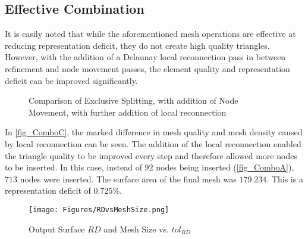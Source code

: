 \subsection{Effective Combination}
It is easily noted that while the aforementioned mesh operations are
effective at reducing representation deficit, they do not create high
quality triangles.  However, with the addition of a Delaunay local
reconnection pass in between refinement and node movement passes, the
element quality and representation deficit can be improved
significantly.

\begin{figure}[h!]
  \begin{center}
  \caption{Comparison of Exclusive Splitting, with addition of Node
Movement, with further addition of local reconnection}
  \label{fig_NodeSmoothing}
  \end{center}
\end{figure}

In \ref{fig_ComboC}, the marked difference in mesh quality and mesh
density caused by local reconnection can be seen.  The addition of the
local reconnection enabled the triangle quality to be improved every
step and therefore allowed more nodes to be inserted. In this case, 
instead of $92$ nodes being inserted (\ref{fig_ComboA}), $713$ nodes were
inserted. The surface area of the final mesh was $179.234$. This is a
representation deficit of $0.725\%$.

\begin{figure}[h!]
  \begin{center}
  \texttt{[image: Figures/RDvsMeshSize.png]}
  \caption{Output Surface $RD$ and Mesh Size vs. $tol_{RD}$}
  \label{fig_RDvsMeshSize}
  \end{center}
\end{figure}

